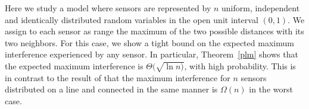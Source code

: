 \documentclass{patmorin}
\begin{document}
%
%

Here we study a model where sensors are represented by $n$ uniform, independent 
and identically distributed random variables in the open unit interval $(0,1)$. We 
assign to each sensor as range the maximum of the 
two possible distances with its two neighbors.
For this case,
we show
a tight bound on the expected maximum interference experienced by any sensor.
In particular,
Theorem~\ref{plm}
shows that the expected maximum interference is $\Theta (\sqrt{\ln n)}$, 
with high probability. This is in contrast to the result of \cite{vonrickenbach2005}
that the maximum interference for $n$ sensors distributed on a line and
connected in the same manner is $\Omega(n)$ in the worst case. 
\end{document}
